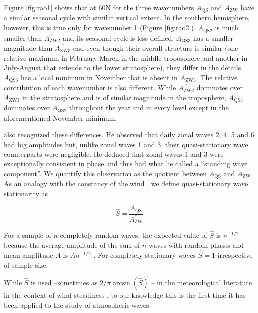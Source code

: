 \documentclass[draft,linenumbers]{agujournal2018}
\begin{document}
Figure \ref{fig:rao1} shows that at 60\degree N for the three
wavenumbers \(A_\mathrm{QS}\) and \(\overline{A_\mathrm{ZW}}\) have a
similar seasonal cycle with similar vertical extent. In the southern
hemisphere, however, this is true only for wavenumber 1 (Figure
\ref{fig:rao2}). \(A_\mathrm{QS2}\) is much smaller than
\(\overline{A_\mathrm{ZW2}}\) and its seasonal cycle is less defined.
\(A_\mathrm{QS3}\) has a smaller magnitude than
\(\overline{A_\mathrm{ZW3}}\) end even though their overall structure is
similar (one relative maximum in February-March in the middle
troposphere and another in July-August that extends to the lower
stratosphere), they differ in the details. \(A_\mathrm{QS3}\) has a
local minimum in November that is absent in
\(\overline{A_\mathrm{ZW3}}\). The relative contribution of each
wavenumber is also different. While \(\overline{A_\mathrm{ZW2}}\)
dominates over \(\overline{A_\mathrm{ZW3}}\) in the stratosphere and is
of similar magnitude in the troposphere, \(A_\mathrm{QS3}\) dominates
over \(A_\mathrm{QS2}\) throughout the year and in every level except in
the aforementioned November minimum.

\citet{Loon1972} also recognized these differences. He observed that
daily zonal waves 2, 4, 5 and 6 had big amplitudes but, unlike zonal
waves 1 and 3, their quasi-stationary wave counterparts were negligible.
He deduced that zonal waves 1 and 3 were exceptionally consistent in
phase and thus had what he called a ``standing wave component''. We
quantify this observation as the quotient between \(A_\mathrm{QS}\) and
\(\overline{A_\mathrm{ZW}}\). As an analogy with the constancy of the
wind \citep{Singer1967}, we define quasi-stationary wave stationarity as

\begin{linenomath*}
\begin{equation}\label{eq:S}
\hat{S} = \frac{A_\mathrm{QS}}{\overline{A_\mathrm{ZW}}}
\end{equation}
\end{linenomath*}

For a sample of \(n\) completely random waves, the expected value of
\(\hat{S}\) is \(n^{-1/2}\) because the average amplitude of the sum of
\(n\) waves with random phases and mean amplitude \(A\) is \(An^{-1/2}\)
\citep{Pain2005}. For completely stationary waves \(\hat{S} = 1\)
irrespective of sample size.

While \(\hat{S}\) is used --sometimes as
\(2/\pi\arcsin \left (\hat{S} \right )\) \citep{Singer1967}-- in the
meteorological literature in the context of wind steadiness
\citep[e.g][]{Hiscox2010}, to our knowledge this is the first time it
has been applied to the study of atmospheric waves.
\end{document}
